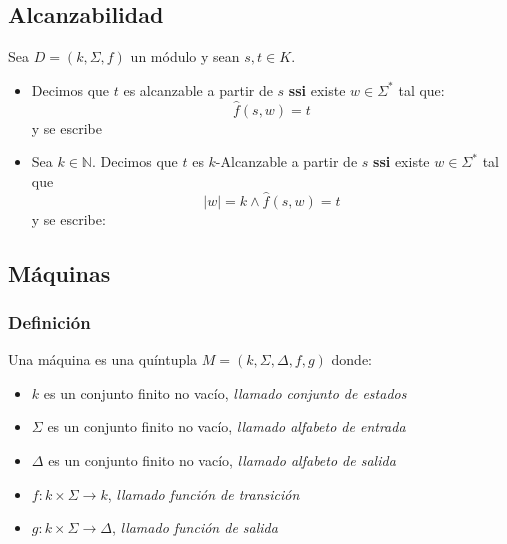 \subsection{Alcanzabilidad}
Sea $D =(k,\Sigma,f)$ un módulo y sean $s,t\in K$.
\begin{itemize}
\item Decimos que $t$ es alcanzable a partir de $s$ \textbf{ssi} existe $w\in\Sigma^*$ tal que:
$$
	\hat{f}(s,w)=t
$$
y se escribe 

\begin{center}
\end{center}
\item Sea $k\in\mathbb{N}$. Decimos que $t$ es $k$-Alcanzable a partir de $s$ \textbf{ssi} existe $w\in\Sigma^*$ tal que $$|w|=k \wedge \hat{f}(s,w)=t$$  y se escribe:
\begin{center}
\end{center}

\end{itemize}
\subsection{Máquinas}
\subsubsection{Definición}
Una máquina es una quíntupla $M=(k,\Sigma,\Delta,f,g)$ donde:
\begin{itemize}
\item $k$ es un conjunto finito no vacío, \textit{llamado conjunto de estados}
\item $\Sigma$ es un conjunto finito no vacío, \textit{llamado alfabeto de entrada}
\item $\Delta$ es un conjunto finito no vacío, \textit{llamado alfabeto de salida}
\item $f:k\times\Sigma\rightarrow k$, \textit{llamado función de transición}
\item $g:k\times\Sigma\rightarrow \Delta$, \textit{llamado función de salida}
\end{itemize}

